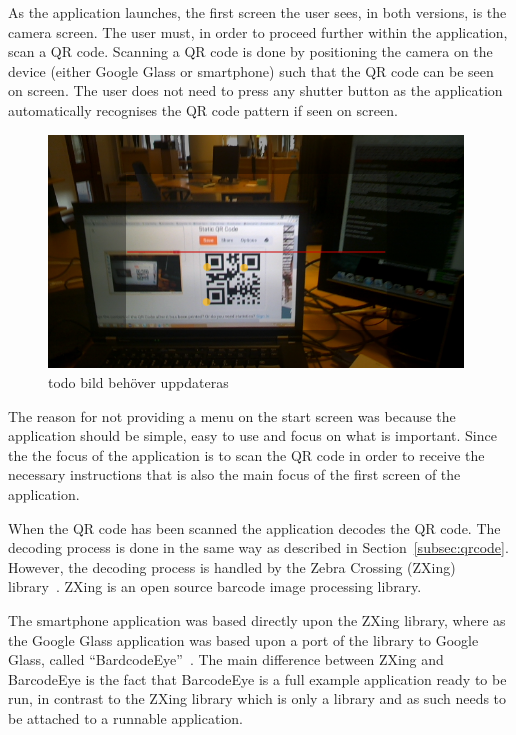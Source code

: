 As the application launches, the first screen the user sees, in both versions, is the camera screen. The user must, in order to proceed further within the application, scan a QR code. Scanning a QR code is done by positioning the camera on the device (either Google Glass or smartphone) such that the QR code can be seen on screen. The user does not need to press any shutter button as the application automatically recognises the QR code pattern if seen on screen.%

	\begin{figure}[ht!]
		\centering
		\includegraphics[width=110mm]{images/demo/qrCode}
		\caption{todo bild behöver uppdateras}
		\label{glassDemoQR}
	\end{figure}

The reason for not providing a menu on the start screen was because the application should be simple, easy to use and focus on what is important. Since the the focus of the application is to scan the QR code in order to receive the necessary instructions that is also the main focus of the first screen of the application.

When the QR code has been scanned the application decodes the QR code. The decoding process is done in the same way as described in Section~\ref{subsec:qrcode}. However, the decoding process is handled by the Zebra Crossing (ZXing) library~\cite{zxing}. ZXing is an open source barcode image processing library.

The smartphone application was based directly upon the ZXing library, where as the Google Glass application was based upon a port of the library to Google Glass, called ``BardcodeEye''~\cite{barcodeEye}. The main difference between ZXing and BarcodeEye is the fact that BarcodeEye is a full example application ready to be run, in contrast to the ZXing library which is only a library and as such needs to be attached to a runnable application.


